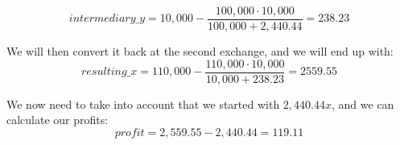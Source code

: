 \begin{equation}
intermediary\_y = 10,000 - \frac{100,000 \cdot 10,000}{100,000 + 2,440.44} = 238.23
\end{equation}

We will then convert it back at the second exchange, and we will end up with:
\begin{equation}
resulting\_x = 110,000 - \frac{110,000 \cdot 10,000}{10,000 + 238.23} = 2559.55
\end{equation}

We now need to take into account that we started with $2,440.44 x$, and we can
calculate our profits:
\begin{equation}
profit = 2,559.55 - 2,440.44 = 119.11
\end{equation}

